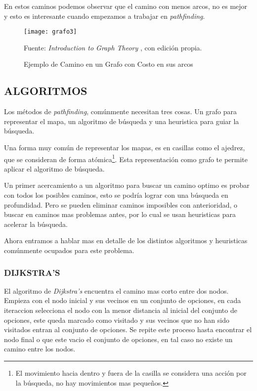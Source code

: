 En estos caminos podemos observar que el camino con menos arcos, no es mejor y esto es interesante cuando empezamos a trabajar en \textit{pathfinding}.

\begin{figure}[h]
\centering
\texttt{[image: grafo3]}
\caption{\label{fig:graph3} Ejemplo de Camino en un Grafo con Costo en sus arcos} Fuente: \textit{Introduction to Graph Theory} \cite{wilson1970introduction}, con edición propia.
\end{figure}

\subsection{ALGORITMOS}

Los métodos de \textit{pathfinding}, comúnmente necesitan tres cosas. Un grafo para representar el mapa, un algoritmo de búsqueda y una heuristica para guiar la búsqueda.\cite{botea2013pathfinding}

Una forma muy común de representar los mapas, es en casillas como el ajedrez, que se consideran de forma atómica\footnote{El movimiento hacia dentro y fuera de la casilla se considera una acción por la búsqueda, no hay movimientos mas pequeños.}. Esta representación como grafo te permite aplicar el algoritmo de búsqueda.

Un primer acercamiento a un algoritmo para buscar un camino optimo es probar con todos los posibles caminos, esto se podría lograr con una búsqueda en profundidad. Pero se pueden eliminar caminos imposibles con anterioridad, o buscar en caminos mas problemas antes, por lo cual se usan heuristicas para acelerar la búsqueda.

Ahora entramos a hablar mas en detalle de los distintos algoritmos y heuristicas comúnmente ocupados para este problema.

\subsubsection{DIJKSTRA'S}

El algoritmo de \textit{Dijkstra's} \cite{dijkstra1959note} encuentra el camino mas corto entre dos nodos. Empieza con el nodo inicial y sus vecinos en un conjunto de opciones, en cada iteraccion selecciona el nodo con la menor distancia al inicial del conjunto de opciones, este queda marcado como visitado y sus vecinos que no han sido visitados entran al conjunto de opciones. Se repite este proceso hasta encontrar el nodo final o que este vacio el conjunto de opciones, en tal caso no existe un camino entre los nodos.

